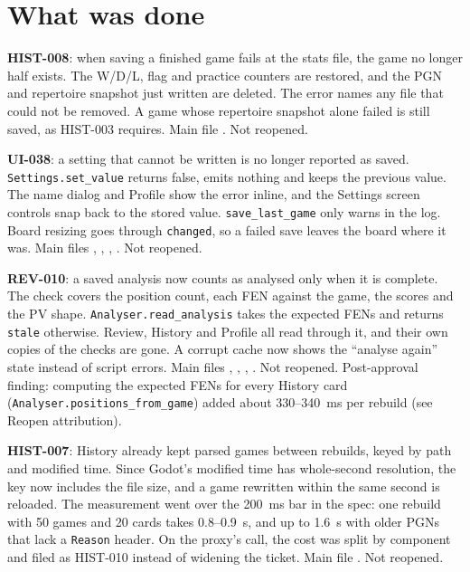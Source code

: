 \documentclass[11pt,a4paper]{article}
\begin{document}
\section*{What was done}

\textbf{HIST-008}: when saving a finished game fails at the stats file, the game no longer half
exists. The W/D/L, flag and practice counters are restored, and the PGN and repertoire snapshot
just written are deleted. The error names any file that could not be removed. A game whose
repertoire snapshot alone failed is still saved, as HIST-003 requires. Main file
. Not reopened.

\textbf{UI-038}: a setting that cannot be written is no longer reported as saved.
\texttt{Settings.set\_value} returns false, emits nothing and keeps the previous value. The name
dialog and Profile show the error inline, and the Settings screen controls snap back to the stored
value. \texttt{save\_last\_game} only warns in the log. Board resizing goes through
\texttt{changed}, so a failed save leaves the board where it was. Main files
, , , . Not
reopened.

\textbf{REV-010}: a saved analysis now counts as analysed only when it is complete. The check
covers the position count, each FEN against the game, the scores and the PV shape.
\texttt{Analyser.read\_analysis} takes the expected FENs and returns \texttt{stale} otherwise. Review,
History and Profile all read through it, and their own copies of the checks are gone. A corrupt
cache now shows the ``analyse again'' state instead of script errors. Main files
, , , .
Not reopened. Post-approval finding: computing the expected FENs for every History card
(\texttt{Analyser.positions\_from\_game}) added about 330--340~ms per rebuild (see Reopen
attribution).

\textbf{HIST-007}: History already kept parsed games between rebuilds, keyed by path and modified
time. Since Godot's modified time has whole-second resolution, the key now includes the file size,
and a game rewritten within the same second is reloaded. The measurement went over the 200~ms bar
in the spec: one rebuild with 50 games and 20 cards takes 0.8--0.9~s, and up to 1.6~s with older
PGNs that lack a \texttt{Reason} header. On the proxy's call, the cost was split by component and
filed as HIST-010 instead of widening the ticket. Main file . Not reopened.
\end{document}
